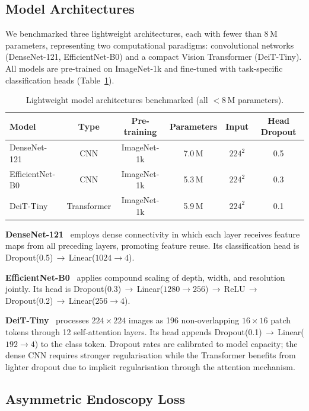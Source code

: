 \documentclass[10pt,a4paper,twocolumn]{article}
\begin{document}
\subsection{Model Architectures}
\label{sec:models}

We benchmarked three lightweight architectures, each with fewer than 8\,M
parameters, representing two computational paradigms: convolutional networks
(DenseNet-121, EfficientNet-B0) and a compact Vision Transformer (DeiT-Tiny).
All models are pre-trained on ImageNet-1k and fine-tuned with task-specific
classification heads (Table~\ref{tab:archs}).

\begin{table}[htbp]
\centering
\caption{Lightweight model architectures benchmarked (all $<$8\,M parameters).}
\label{tab:archs}
\begin{tabular}{lccccc}
\toprule
\textbf{Model} & \textbf{Type} & \textbf{Pre-training} &
\textbf{Parameters} & \textbf{Input} & \textbf{Head Dropout}\\
\midrule
DenseNet-121    & CNN         & ImageNet-1k & 7.0\,M & $224^2$ & 0.5\\
EfficientNet-B0 & CNN         & ImageNet-1k & 5.3\,M & $224^2$ & 0.3\\
DeiT-Tiny       & Transformer & ImageNet-1k & 5.9\,M & $224^2$ & 0.1\\
\bottomrule
\end{tabular}
\end{table}

\textbf{DenseNet-121}~\citep{Huang2017} employs dense connectivity in which
each layer receives feature maps from all preceding layers, promoting feature
reuse. Its classification head is Dropout(0.5)\,$\to$\,Linear($1024\!\to\!4$).

\textbf{EfficientNet-B0}~\citep{Tan2019} applies compound scaling of depth,
width, and resolution jointly. Its head is
Dropout(0.3)\,$\to$\,Linear($1280\!\to\!256$)\,$\to$\,ReLU\,$\to$\,
Dropout(0.2)\,$\to$\,Linear($256\!\to\!4$).

\textbf{DeiT-Tiny}~\citep{Touvron2021} processes $224\times224$ images as
196 non-overlapping $16\times16$ patch tokens through 12 self-attention
layers. Its head appends Dropout(0.1)\,$\to$\,Linear($192\!\to\!4$) to the
class token. Dropout rates are calibrated to model capacity; the dense CNN
requires stronger regularisation while the Transformer benefits from lighter
dropout due to implicit regularisation through the attention mechanism.

\subsection{Asymmetric Endoscopy Loss}
\label{sec:ael}
\end{document}

